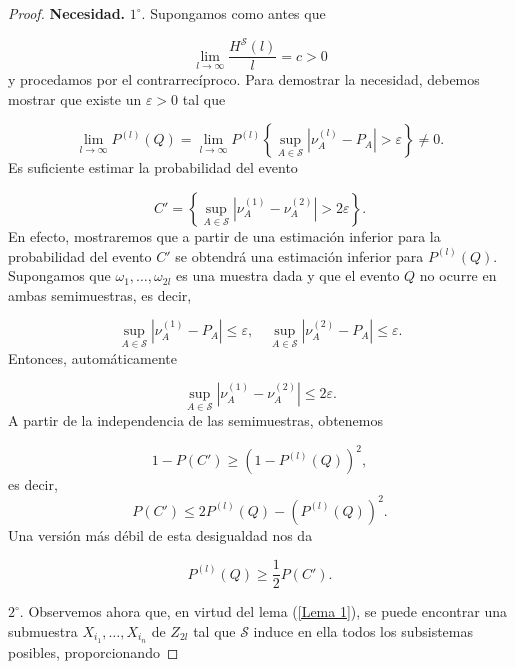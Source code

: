 \documentclass{report}
\begin{document}
\begin{proof}
\textbf{Necesidad.}\newline
\( 1^\circ \). Supongamos como antes que

\begin{equation}\label{eq 23}
\lim_{l \to \infty} \frac{H^{\mathcal{S}}(l)}{l} = c > 0
\end{equation}
y procedamos por el contrarrecíproco. Para demostrar la necesidad, debemos mostrar que existe un \( \varepsilon > 0 \) tal que

\begin{equation*}
\lim_{l \to \infty} P^{(l)}(Q) = \lim_{l \to \infty} P^{(l)} \left\{ \sup_{A \in \mathcal{S}} \left| \nu_A^{(l)} - P_A \right| > \varepsilon \right\} \neq 0.
\end{equation*}
Es suficiente estimar la probabilidad del evento

\begin{equation*}
C' = \left\{ \sup_{A \in \mathcal{S}} \left| \nu_A^{(1)} - \nu_A^{(2)} \right| > 2\varepsilon \right\}.
\end{equation*}
En efecto, mostraremos que a partir de una estimación inferior para la probabilidad del evento \( C' \) se obtendrá una estimación inferior para \( P^{(l)}(Q) \). Supongamos que \( \omega_1, \dots, \omega_{2l} \) es una muestra dada y que el evento \( Q \) no ocurre en ambas semimuestras, es decir,

\begin{equation*}
\sup_{A \in \mathcal{S}} \left| \nu_A^{(1)} - P_A \right| \leq \varepsilon, \quad \sup_{A \in \mathcal{S}} \left| \nu_A^{(2)} - P_A \right| \leq \varepsilon.
\end{equation*}
Entonces, automáticamente

\begin{equation*}
\sup_{A \in \mathcal{S}} \left| \nu_A^{(1)} - \nu_A^{(2)} \right| \leq 2\varepsilon.
\end{equation*}
A partir de la independencia de las semimuestras, obtenemos

\begin{equation*}
1 - P(C') \geq (1 - P^{(l)}(Q))^2, 
\end{equation*}
es decir, 
\[
P(C') \leq 2P^{(l)}(Q) - \left(P^{(l)}(Q)\right)^2.
\]
Una versión más débil de esta desigualdad nos da

\begin{equation*}
P^{(l)}(Q) \geq \frac{1}{2} P(C').
\end{equation*}

\bigskip
\( 2^\circ \). Observemos ahora que, en virtud del lema (\ref{Lema 1}), se puede encontrar una submuestra \( X_{i_1}, \dots, X_{i_n} \) de \( Z_{2l} \) tal que \( \mathcal{S} \) induce en ella todos los subsistemas posibles, proporcionando


\end{proof}
\end{document}
